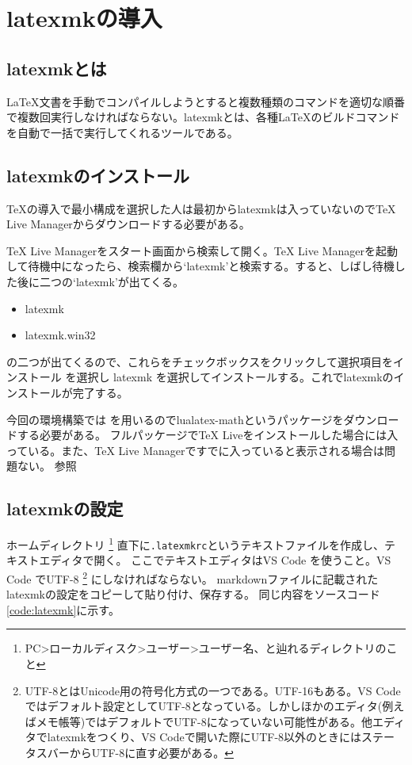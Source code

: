 \documentclass[titlepage]{ltjsarticle}
\begin{document}
\section{latexmkの導入}
\subsection{latexmkとは}
\LaTeX 文書を手動でコンパイルしようとすると複数種類のコマンドを適切な順番で複数回実行しなければならない。latexmkとは、各種\LaTeX のビルドコマンドを自動で一括で実行してくれるツールである。

\subsection{latexmkのインストール}

TeXの導入で最小構成を選択した人は最初からlatexmkは入っていないのでTeX Live Managerからダウンロードする必要がある。

TeX Live Managerをスタート画面から検索して開く。TeX Live Managerを起動して待機中になったら、検索欄から`latexmk'と検索する。すると、しばし待機した後に二つの`latexmk'が出てくる。
\begin{itemize}
  \item latexmk
  \item latexmk.win32
\end{itemize}
の二つが出てくるので、これらをチェックボックスをクリックして選択項目をインストール を選択し latexmk を選択してインストールする。これでlatexmkのインストールが完了する。

今回の環境構築では\LuaLaTeX
を用いるのでlualatex-mathというパッケージをダウンロードする必要がある。
フルパッケージでTeX Liveをインストールした場合には入っている。また、TeX Live Managerですでに入っていると表示される場合は問題ない。
  \cite{TeX liveトラブルシューティングlualatex}参照

\subsection{latexmkの設定}
ホームディレクトリ
\footnote{
  PC>ローカルディスク>ユーザー>ユーザー名、と辿れるディレクトリのこと
}
直下に\verb|.latexmkrc|というテキストファイルを作成し、テキストエディタで開く。
ここでテキストエディタはVS Code を使うこと。VS Code でUTF-8
\footnote{UTF-8とはUnicode用の符号化方式の一つである。UTF-16もある。VS Codeではデフォルト設定としてUTF-8となっている。しかしほかのエディタ(例えばメモ帳等)ではデフォルトでUTF-8になっていない可能性がある。他エディタでlatexmkをつくり、VS Codeで開いた際にUTF-8以外のときにはステータスバーからUTF-8に直す必要がある。\cite{VSCodeの文字コード}}
にしなければならない。
markdownファイルに記載されたlatexmkの設定をコピーして貼り付け、保存する。
同じ内容をソースコード\ref{code:latexmk}に示す。
\end{document}
